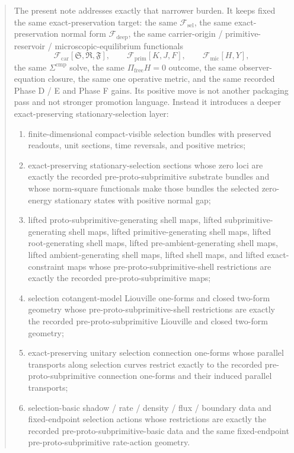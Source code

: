 \documentclass[11pt]{article}
\newcommand{\GaugeAux}{Y}
\newcommand{\MicFunctional}{\mathscr F_{\mathrm{mic}}}
\newcommand{\PrimFunctional}{\mathscr F_{\mathrm{prim}}}
\newcommand{\CarrierFunctional}{\mathscr F_{\mathrm{car}}}
\newcommand{\DeepFunctional}{\mathscr F_{\mathrm{deep}}}
\newcommand{\StemFunctional}{\mathscr F_{\mathrm{sel}}}
\newcommand{\PrimStrain}{K}
\newcommand{\PrimNeutral}{J}
\newcommand{\PrimFree}{F}
\newcommand{\CarrierSeed}{\mathfrak S}
\newcommand{\RelabelSeed}{\mathfrak R}
\newcommand{\FreeSeed}{\mathfrak F}
\begin{document}
\begin{abstract}
The present note addresses exactly that narrower burden. It keeps fixed the same exact-preservation target: the same \(\StemFunctional\), the same exact-preservation normal form \(\DeepFunctional\), the same carrier-origin / primitive-reservoir / microscopic-equilibrium functionals
\[
\CarrierFunctional[\CarrierSeed,\RelabelSeed,\FreeSeed],\qquad
\PrimFunctional[\PrimStrain,\PrimNeutral,\PrimFree],\qquad
\MicFunctional[H,\GaugeAux],
\]
the same \(\Sigma^{\mathrm{cmp}}\) solve, the same \(\Pi_{\mathrm{free}}H=0\) outcome, the same observer-equation closure, the same one operative metric, and the same recorded Phase D / E and Phase F gains. Its positive move is not another packaging pass and not stronger promotion language. Instead it introduces a deeper exact-preserving stationary-selection layer:
\begin{enumerate}
    \item finite-dimensional compact-visible selection bundles with preserved readouts, unit sections, time reversals, and positive metrics;
    \item exact-preserving stationary-selection sections whose zero loci are exactly the recorded pre-proto-subprimitive substrate bundles and whose norm-square functionals make those bundles the selected zero-energy stationary states with positive normal gap;
    \item lifted proto-subprimitive-generating shell maps, lifted subprimitive-generating shell maps, lifted primitive-generating shell maps, lifted root-generating shell maps, lifted pre-ambient-generating shell maps, lifted ambient-generating shell maps, lifted shell maps, and lifted exact-constraint maps whose pre-proto-subprimitive-shell restrictions are exactly the recorded pre-proto-subprimitive maps;
    \item selection cotangent-model Liouville one-forms and closed two-form geometry whose pre-proto-subprimitive-shell restrictions are exactly the recorded pre-proto-subprimitive Liouville and closed two-form geometry;
    \item exact-preserving unitary selection connection one-forms whose parallel transports along selection curves restrict exactly to the recorded pre-proto-subprimitive connection one-forms and their induced parallel transports;
    \item selection-basic shadow / rate / density / flux / boundary data and fixed-endpoint selection actions whose restrictions are exactly the recorded pre-proto-subprimitive-basic data and the same fixed-endpoint pre-proto-subprimitive rate-action geometry.
\end{enumerate}


\end{abstract}
\end{document}
